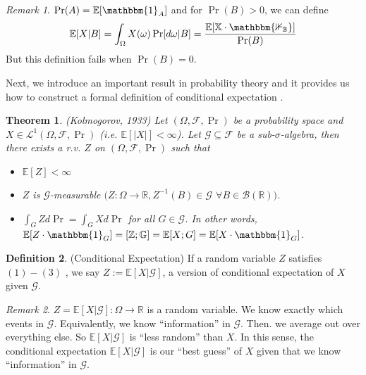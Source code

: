 \documentclass[a4paper,11pt]{report}
\theoremstyle{plain} %
\newtheorem{thm}{Theorem}[section]
\theoremstyle{definition} %
\newtheorem{defn}[thm]{Definition}
\theoremstyle{remark} %
\newtheorem*{rem}{Remark}
\begin{document}
\begin{rem} $\Pr(A)=\mathbb{E}[\mathbbm{1}_{A}]$ and for $\Pr(B)>0$, we can define
\begin{align*}
    \mathbb{E}[X|B]= \int_{\Omega}X(\omega)\Pr[d\omega | B] = \frac{\mathbb{E[X\cdot \mathbbm{1_{B}}]}}{\Pr(B)}
\end{align*}
But this definition fails when $\Pr (B) =0$. 
\end{rem}

\par Next, we introduce an important result in probability theory and it provides us how to construct a formal definition of conditional expectation .


\begin{thm} (Kolmogorov, 1933) Let $(\Omega, \mathcal{F},\Pr)$ be a probability space and $X\in \mathcal{L}^1(\Omega, \mathcal{F},\Pr)$ (i.e. $\mathbb{E}[|X|]<\infty$). Let $\mathcal{G}\subseteq \mathcal{F}$ be a sub-$\sigma$-algebra, then there exists a r.v. $Z$ on $(\Omega, \mathcal{F},\Pr)$ such that 
\begin{itemize}
    \item[(1)] $\mathbb{E}[Z]<\infty $
    \item[(2)] $Z$ is $\mathcal{G}$-measurable $(Z:\Omega \rightarrow \mathbb{R}, Z^{-1}(B)\in \mathcal{G}$ $\forall B \in \mathcal{B}(\mathbb{R}) )$.
    \item[(3)] $\int_{G}Z d \Pr = \int_{G} X d \Pr $ for all $G\in \mathcal{G}$. In other words, $\mathbb{E}[Z\cdot \mathbbm{1}_{G}]=\mathbb{[Z;G]}=\mathbb{E}[X;G]=\mathbb{E}[X\cdot \mathbbm{1}_{G}]$.
\end{itemize}
\end{thm}

\begin{defn}(Conditional Expectation) If a random variable $Z$ satisfies $(1)-(3)$ , we say $Z:=\mathbb{E}[X|\mathcal{G}]$, a version of conditional expectation of $X$ given $\mathcal{G}$.
\end{defn}

\begin{rem} $Z=\mathbb{E}[X|\mathcal{G}]: \Omega \rightarrow \mathbb{R}$ is a random variable. We know exactly which events in $\mathcal{G}$. Equivalently, we know ``information'' in $\mathcal{G}$. Then. we average out over everything else. So $\mathbb{E}[X|\mathcal{G}]$ is ``less random'' than $X$. In this sense, the conditional expectation $\mathbb{E}[X|\mathcal{G}]$ is our ``best guess'' of $X$ given that we know ``information'' in $\mathcal{G}$.
\end{rem}
\end{document}
